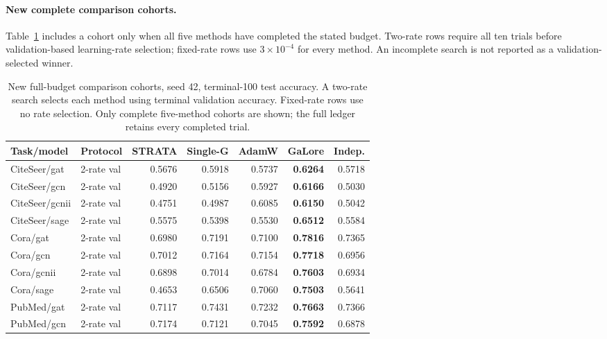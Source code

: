 \paragraph{New complete comparison cohorts.}
Table~\ref{tab:new-cohorts} includes a cohort only when all five methods have completed the stated budget. Two-rate rows require all ten trials before validation-based learning-rate selection; fixed-rate rows use $3\times10^{-4}$ for every method. An incomplete search is not reported as a validation-selected winner.
\begin{table}[t]
\centering\footnotesize
\caption{New full-budget comparison cohorts, seed 42, terminal-100 test accuracy. A two-rate search selects each method using terminal validation accuracy. Fixed-rate rows use no rate selection. Only complete five-method cohorts are shown; the full ledger retains every completed trial.}
\label{tab:new-cohorts}
\setlength{\tabcolsep}{3pt}
\begin{adjustbox}{max width=\linewidth}
\begin{tabular}{llrrrrr}\toprule
Task/model & Protocol & STRATA & Single-G & AdamW & GaLore & Indep.\\\midrule
CiteSeer/gat & 2-rate val & \cellcolor{oursbg}0.5676 & 0.5918 & 0.5737 & \textbf{0.6264} & 0.5718 \\
CiteSeer/gcn & 2-rate val & \cellcolor{oursbg}0.4920 & 0.5156 & 0.5927 & \textbf{0.6166} & 0.5030 \\
CiteSeer/gcnii & 2-rate val & \cellcolor{oursbg}0.4751 & 0.4987 & 0.6085 & \textbf{0.6150} & 0.5042 \\
CiteSeer/sage & 2-rate val & \cellcolor{oursbg}0.5575 & 0.5398 & 0.5530 & \textbf{0.6512} & 0.5584 \\
Cora/gat & 2-rate val & \cellcolor{oursbg}0.6980 & 0.7191 & 0.7100 & \textbf{0.7816} & 0.7365 \\
Cora/gcn & 2-rate val & \cellcolor{oursbg}0.7012 & 0.7164 & 0.7154 & \textbf{0.7718} & 0.6956 \\
Cora/gcnii & 2-rate val & \cellcolor{oursbg}0.6898 & 0.7014 & 0.6784 & \textbf{0.7603} & 0.6934 \\
Cora/sage & 2-rate val & \cellcolor{oursbg}0.4653 & 0.6506 & 0.7060 & \textbf{0.7503} & 0.5641 \\
PubMed/gat & 2-rate val & \cellcolor{oursbg}0.7117 & 0.7431 & 0.7232 & \textbf{0.7663} & 0.7366 \\
PubMed/gcn & 2-rate val & \cellcolor{oursbg}0.7174 & 0.7121 & 0.7045 & \textbf{0.7592} & 0.6878 \\

\end{tabular}
\end{adjustbox}
\end{table}
